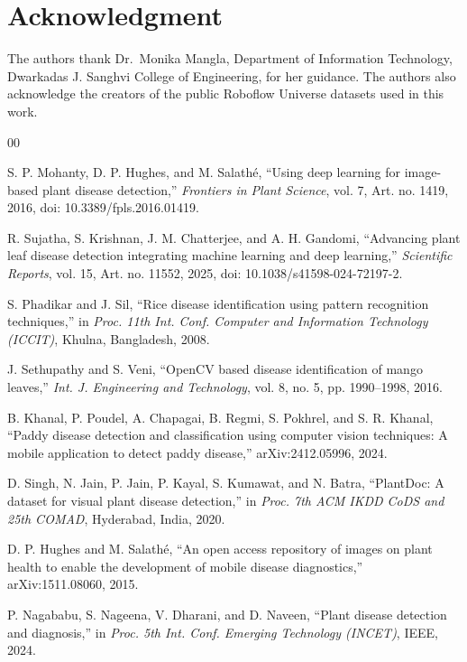 \documentclass[conference]{IEEEtran}
\begin{document}
\section*{Acknowledgment}
The authors thank Dr.\ Monika Mangla, Department of Information Technology, Dwarkadas J. Sanghvi College of Engineering, for her guidance. The authors also acknowledge the creators of the public Roboflow Universe datasets used in this work.

\begin{thebibliography}{00}
\raggedright

 S. P. Mohanty, D. P. Hughes, and M. Salath\'{e}, ``Using deep learning for image-based plant disease detection,'' \textit{Frontiers in Plant Science}, vol. 7, Art. no. 1419, 2016, doi: 10.3389/fpls.2016.01419.

 R. Sujatha, S. Krishnan, J. M. Chatterjee, and A. H. Gandomi, ``Advancing plant leaf disease detection integrating machine learning and deep learning,'' \textit{Scientific Reports}, vol. 15, Art. no. 11552, 2025, doi: 10.1038/s41598-024-72197-2.

 S. Phadikar and J. Sil, ``Rice disease identification using pattern recognition techniques,'' in \textit{Proc. 11th Int. Conf. Computer and Information Technology (ICCIT)}, Khulna, Bangladesh, 2008.

 J. Sethupathy and S. Veni, ``OpenCV based disease identification of mango leaves,'' \textit{Int. J. Engineering and Technology}, vol. 8, no. 5, pp. 1990--1998, 2016.

 B. Khanal, P. Poudel, A. Chapagai, B. Regmi, S. Pokhrel, and S. R. Khanal, ``Paddy disease detection and classification using computer vision techniques: A mobile application to detect paddy disease,'' arXiv:2412.05996, 2024.

 D. Singh, N. Jain, P. Jain, P. Kayal, S. Kumawat, and N. Batra, ``PlantDoc: A dataset for visual plant disease detection,'' in \textit{Proc. 7th ACM IKDD CoDS and 25th COMAD}, Hyderabad, India, 2020.

 D. P. Hughes and M. Salath\'{e}, ``An open access repository of images on plant health to enable the development of mobile disease diagnostics,'' arXiv:1511.08060, 2015.

 P. Nagababu, S. Nageena, V. Dharani, and D. Naveen, ``Plant disease detection and diagnosis,'' in \textit{Proc. 5th Int. Conf. Emerging Technology (INCET)}, IEEE, 2024.


\end{thebibliography}
\end{document}
